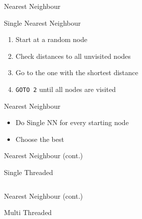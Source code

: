 
\begin{frame}{Nearest Neighbour}
  \begin{block}{Single Nearest Neighbour}
    \begin{enumerate}
      \item Start at a random node
      \item Check distances to all unvisited nodes
      \item Go to the one with the shortest distance
      \item \texttt{GOTO 2} until all nodes are visited
    \end{enumerate}
  \end{block}
  \pause
  \begin{block}{Nearest Neighbour}
    \begin{itemize}
      \item Do Single NN for every starting node
      \item Choose the best
    \end{itemize}
  \end{block}
\end{frame}

\begin{frame}{Nearest Neighbour (cont.)}
      \begin{block}{Single Threaded}
      \footnotesize\inputminted[xleftmargin=1em,fontsize=\large,linenos]{rust}{./assets/03_NN_single.rs}
      \end{block}
\end{frame}

\begin{frame}{Nearest Neighbour (cont.)}
      \begin{block}{Multi Threaded}
        \footnotesize\inputminted[xleftmargin=1em,fontsize=\large,linenos]{rust}{./assets/03_NN_parallel.rs}
      \end{block}
\end{frame}


